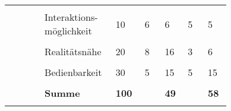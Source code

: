 \documentclass[main.tex]{subfiles} %
\begin{document}
\begin{table}[ht]
\begin{tabular}{|p{0.14\linewidth}|p{0.15\linewidth}|p{0.115\linewidth}|p{0.08\linewidth}|p{0.09\linewidth}|p{0.08\linewidth}|p{0.09\linewidth}|}
        \cline{2-7}
                                                           &                                     &                                              &                                                &             &            &             \\[-9pt]
                                                           & Interaktions-möglichkeit            & 10                                           & 6                                              & 6           & 5          & 5           \\[1pt]
        \cline{2-7}
                                                           &                                     &                                              &                                                &             &            &             \\[-9pt]
                                                           & Realitätsnähe                       & 20                                           & 8                                              & 16          & 3          & 6           \\[1pt]
        \cline{2-7}
                                                           &                                     &                                              &                                                &             &            &             \\[-9pt]
                                                           & Bedienbarkeit                       & 30                                           & 5                                              & 15          & 5          & 15          \\[1pt]
        \cline{2-7}
                                                           &                                     &                                              &                                                &             &            &             \\[-9pt]
                                                           & \textbf{Summe}                      & \textbf{100}                                 &                                                & \textbf{49} &            & \textbf{58} \\[1pt]
        \hline
        \hline
                                                           & \multicolumn{2}{c|}{}               & \multicolumn{2}{c|}{}                        & \multicolumn{2}{c|}{}                                                                   \\[-9pt]

\end{tabular}
\end{table}
\end{document}
